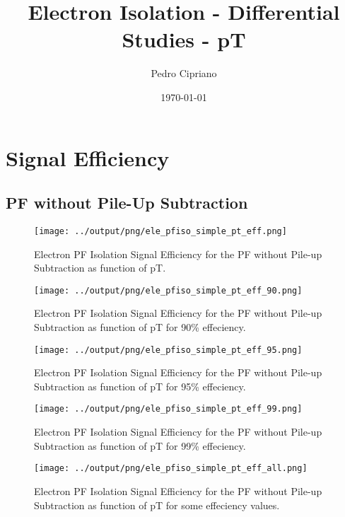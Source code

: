 \documentclass[11pt]{book}
\begin{document}
         
 
 \author{Pedro Cipriano}
 \date{\today}
 \title{Electron Isolation - Differential Studies - pT}

\maketitle

\tableofcontents


\chapter{Signal Efficiency}
\section{PF without Pile-Up Subtraction}
\begin{figure}[htb]
\centering
\texttt{[image: ../output/png/ele\_pfiso\_simple\_pt\_eff.png]}
\caption{Electron PF Isolation Signal Efficiency for the PF without Pile-up Subtraction as function of pT.}
\label{fig:ele_pfiso_pt_eff_simple}
\end{figure}

\begin{figure}[htb]
\centering
\texttt{[image: ../output/png/ele\_pfiso\_simple\_pt\_eff\_90.png]}
\caption{Electron PF Isolation Signal Efficiency for the PF without Pile-up Subtraction as function of pT for 90\% effeciency.}
\label{fig:ele_pfiso_pt_eff_simple_eff_90}
\end{figure}

\begin{figure}[htb]
\centering
\texttt{[image: ../output/png/ele\_pfiso\_simple\_pt\_eff\_95.png]}
\caption{Electron PF Isolation Signal Efficiency for the PF without Pile-up Subtraction as function of pT for 95\% effeciency.}
\label{fig:ele_pfiso_pt_eff_simple_eff_95}
\end{figure}

\begin{figure}[htb]
\centering
\texttt{[image: ../output/png/ele\_pfiso\_simple\_pt\_eff\_99.png]}
\caption{Electron PF Isolation Signal Efficiency for the PF without Pile-up Subtraction as function of pT for 99\% effeciency.}
\label{fig:ele_pfiso_pt_eff_simple_eff_99}
\end{figure}

\begin{figure}[htb]
\centering
\texttt{[image: ../output/png/ele\_pfiso\_simple\_pt\_eff\_all.png]}
\caption{Electron PF Isolation Signal Efficiency for the PF without Pile-up Subtraction as function of pT for some effeciency values.}
\label{fig:ele_pfiso_pt_eff_simple_eff_all}
\end{figure}
\end{document}
